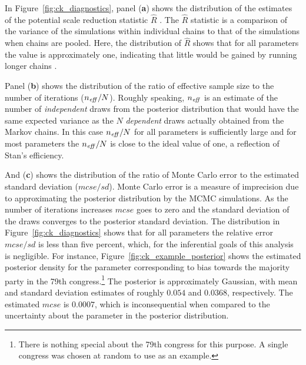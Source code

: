 In Figure~\ref{fig:ck_diagnostics}, panel ({\bf a}) shows the distribution of the estimates of the potential scale reduction statistic $\hat{R}$  . The $\hat{R}$ statistic is a comparison of the variance of the simulations within individual chains to that of the simulations when chains are pooled. Here, the distribution of $\hat{R}$ shows that for all parameters the value is approximately one, indicating that little would be gained by running longer chains . 

Panel ({\bf b}) shows the distribution of the ratio of effective sample size to the number of iterations ($n_{\it eff}/N$). Roughly speaking, $n_{\it eff}$ is an estimate of the number of {\it independent} draws from the posterior distribution that would have the same expected variance as the $N$ {\it dependent} draws actually obtained from the Markov chains. In this case $n_{\it eff}/N$ for all parameters is sufficiently large and for most parameters the $n_{\it eff}/N$ is close to the ideal value of one, a reflection of Stan's efficiency. 


And ({\bf c}) shows the distribution of the ratio of Monte Carlo error to the estimated standard deviation ($mcse/sd$). Monte Carlo error is a measure of imprecision due to approximating the posterior distribution by the MCMC simulations. As the number of iterations increases $mcse$ goes to zero and the standard deviation of the draws converges to the posterior standard deviation. The distribution in Figure~\ref{fig:ck_diagnostics} shows that for all parameters the relative error $mcse/sd$ is less than five percent, which, for the inferential goals of this analysis is negligible. For instance, Figure~\ref{fig:ck_example_posterior} shows the estimated posterior density for the parameter corresponding to bias towards the majority party in the 79th congress.\footnote{There is nothing special about the 79th congress for this purpose. A single congress was chosen at random to use as an example.} The posterior is approximately Gaussian, with mean and standard deviation estimates of roughly $0.054$ and $0.0368$, respectively. The estimated $mcse$ is $0.0007$, which is inconsequential when compared to the uncertainty about the parameter in the posterior distribution.   


